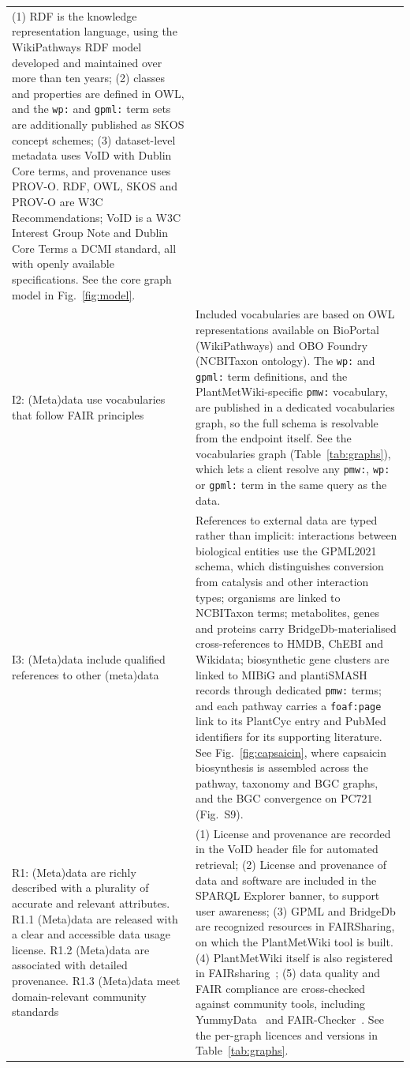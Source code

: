 \documentclass[11pt,a4paper]{article}
\newcommand{\rev}[1]{#1}
\begin{document}
{\begin{longtable}{p{} p{}}
(1) RDF is the knowledge representation language, using the WikiPathways RDF model developed
and maintained over more than ten years; (2) classes and properties are defined in OWL, and the
\texttt{wp:} and \texttt{gpml:} term sets are additionally published as SKOS concept schemes; (3)
dataset-level metadata uses VoID with Dublin Core terms, and provenance uses PROV-O. RDF, OWL, SKOS
and PROV-O are W3C Recommendations; VoID is a W3C Interest Group Note and Dublin Core Terms a DCMI
standard, all with openly available specifications.
\rev{See the core graph model in Fig.~\ref{fig:model}.} \\
\addlinespace
I2: (Meta)data use vocabularies that follow FAIR principles &
Included vocabularies are based on OWL representations available on BioPortal (WikiPathways) and OBO
Foundry (NCBITaxon ontology). The \texttt{wp:} and \texttt{gpml:} term definitions, and the
PlantMetWiki-specific \texttt{pmw:} vocabulary, are published in a dedicated vocabularies graph, so
the full schema is resolvable from the endpoint itself.
\rev{See the vocabularies graph (Table~\ref{tab:graphs}), which lets a client resolve
any \texttt{pmw:}, \texttt{wp:} or \texttt{gpml:} term in the same query as the data.} \\
\addlinespace
I3: (Meta)data include qualified references to other (meta)data &

References to external data are typed rather than implicit: interactions between biological
entities use the GPML2021 schema, which distinguishes conversion from catalysis and other
interaction types; organisms are linked to NCBITaxon terms; metabolites, genes and proteins carry
BridgeDb-materialised cross-references to HMDB, ChEBI and Wikidata; biosynthetic gene clusters are
linked to MIBiG and plantiSMASH records through dedicated \texttt{pmw:} terms; and each pathway carries a
\texttt{foaf:page} link to its PlantCyc entry and PubMed identifiers for its supporting literature.
\rev{See Fig.~\ref{fig:capsaicin}, where capsaicin biosynthesis is assembled across the
pathway, taxonomy and BGC graphs, and the BGC convergence on PC721 (Fig.~S9).} \\
\addlinespace
R1: (Meta)data are richly described with a plurality of accurate and relevant attributes.
R1.1 (Meta)data are released with a clear and accessible data usage license.
R1.2 (Meta)data are associated with detailed provenance.
R1.3 (Meta)data meet domain-relevant community standards &
(1) License and provenance are recorded in the VoID header file for automated retrieval;
(2) License and provenance of data and software are included in the SPARQL Explorer banner, to support user
awareness;
(3) GPML and BridgeDb are recognized resources in FAIRSharing, on which the PlantMetWiki tool is
built. (4) PlantMetWiki itself is also registered in FAIRsharing~\cite{plantmetwiki2026fairsharing}; (5) data quality and FAIR compliance are cross-checked against community tools, including YummyData~\cite{yamamoto2018} and FAIR-Checker~\cite{gaignard2023}.
\rev{See the per-graph licences and versions in Table~\ref{tab:graphs}.} \\
\end{longtable}
}
\end{document}

